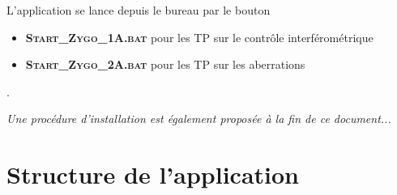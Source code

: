 \begin{tcolorbox}[myboxstyle]
\begin{large}
\begin{center}
L'application se lance depuis le bureau par le bouton 

\begin{itemize}
	\item \textbf{\textsc{Start\_Zygo\_1A.bat}}  pour les TP sur le contrôle interférométrique
	\item \textbf{\textsc{Start\_Zygo\_2A.bat}}  pour les TP sur les aberrations
\end{itemize}

 .
\end{center}
\end{large}
\end{tcolorbox}

\bigskip

\textit{Une procédure d'installation est également proposée à la fin de ce document...}


\newpage
\section{Structure de l'application}